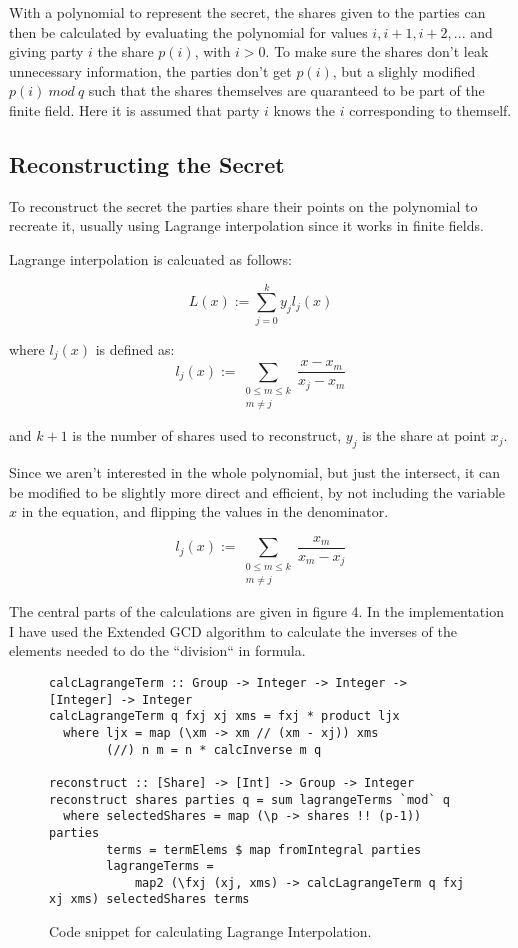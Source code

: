 \documentclass[a4paper,oneside,12pt,final]{article}
\begin{document}
With a polynomial to represent the secret, the shares given to the parties can
then be calculated by evaluating the polynomial for values $i, i+1, i+2, ...$
and giving party $i$ the share $p(i)$, with $i > 0$. To make sure the shares
don't leak unnecessary information, the parties don't get $p(i)$, but a slighly
modified $p(i)\ mod\ q$ such that the shares themselves are quaranteed to be
part of the finite field. Here it is assumed that party $i$ knows the $i$
corresponding to themself.

\subsection{Reconstructing the Secret}

To reconstruct the secret the parties share their points on the polynomial to
recreate it, usually using Lagrange interpolation since it works in
finite fields.

Lagrange interpolation is calcuated as follows:

\[
L(x) := \sum_{j=0}^k y_j l_j(x)
\]

where $l_j(x)$ is defined as:
\[
l_j(x) := \sum\limits_{\substack{0\leq m \leq k\\m \neq j}}\frac{x - x_m}{x_j - x_m}
\]

and $k+1$ is the number of shares used to reconstruct, $y_j$ is the share at
point $x_j$. 

Since we aren't interested in the whole polynomial, but just the intersect, it
can be modified to be slightly more direct and efficient, by not including the
variable $x$ in the equation, and flipping the values in the denominator.

\[
l_j(x) := \sum\limits_{\substack{0\leq m \leq k\\m \neq j}}\frac{x_m}{x_m - x_j}
\]

The central parts of the calculations are given in figure 4. In the
implementation I have used the Extended GCD algorithm to calculate the inverses
of the elements needed to do the ``division`` in formula. 

\begin{figure}[h]
\label{fig:calculate-lagrange}
\begin{verbatim}
calcLagrangeTerm :: Group -> Integer -> Integer -> [Integer] -> Integer
calcLagrangeTerm q fxj xj xms = fxj * product ljx
  where ljx = map (\xm -> xm // (xm - xj)) xms
        (//) n m = n * calcInverse m q

reconstruct :: [Share] -> [Int] -> Group -> Integer
reconstruct shares parties q = sum lagrangeTerms `mod` q
  where selectedShares = map (\p -> shares !! (p-1)) parties
        terms = termElems $ map fromIntegral parties  
        lagrangeTerms = 
            map2 (\fxj (xj, xms) -> calcLagrangeTerm q fxj xj xms) selectedShares terms
\end{verbatim}
\caption{Code snippet for calculating Lagrange Interpolation.}
\end{figure}
\end{document}

